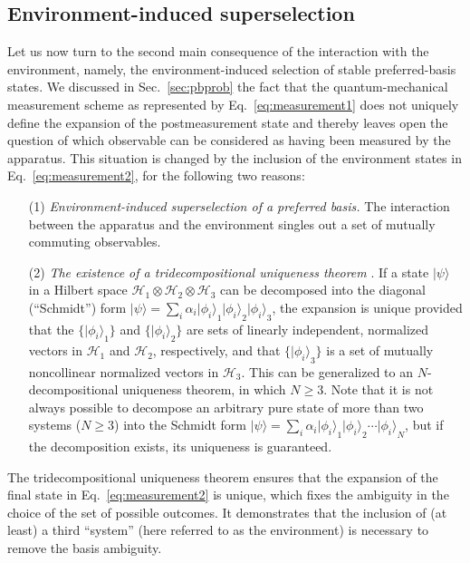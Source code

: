 \documentclass[twocolumn,rmp,aps,amsmath,amsfonts,noshowkeys,noshowpacs]{revtex4}
\newcommand{\ket}[1]{\ensuremath{|{#1\rangle}}}
\begin{document}
\subsection{Environment-induced superselection \label{sec:einsel}}

Let us now turn to the second main consequence of the interaction with
the environment, namely, the environment-induced selection of stable
preferred-basis states.  We discussed in Sec.~\ref{sec:pbprob} the
fact that the quantum-mechanical measurement scheme as represented by
Eq.~\eqref{eq:measurement1} does not uniquely define the expansion of
the postmeasurement state and thereby leaves open the question of
which observable can be considered as having been measured by the
apparatus.  This situation is changed by the inclusion of the
environment states in Eq.~\eqref{eq:measurement2}, for the following
two reasons:

\begin{enumerate} 

\item[(1)] {\em Environment-induced superselection of a preferred basis.}
  The interaction between the apparatus and the environment singles
  out a set of mutually commuting observables.
  
\item[(2)] {\em The existence of a tridecompositional uniqueness
    theorem} \citep{Elby:1994:tz,Clifton:1995:po,Bub:1997:iq}. If a
  state $\ket{\psi}$ in a Hilbert space $\mathcal{H}_1 \otimes
  \mathcal{H}_2 \otimes \mathcal{H}_3$ can be decomposed into the
  diagonal (``Schmidt'') form $\ket{\psi} = \sum_i \alpha_i
  \ket{\phi_i}_1 \ket{\phi_i}_2 \ket{\phi_i}_3$, the expansion is
  unique provided that the $\{ \ket{\phi_i}_1 \}$ and $\{
  \ket{\phi_i}_2 \}$ are sets of linearly independent, normalized
  vectors in $\mathcal{H}_1$ and $\mathcal{H}_2$, respectively, and
  that $\{ \ket{\phi_i}_3 \}$ is a set of mutually noncollinear
  normalized vectors in $\mathcal{H}_3$.  This can be generalized to
  an $N$-decompositional uniqueness theorem, in which $N \ge 3$.  Note
  that it is not always possible to decompose an arbitrary pure state
  of more than two systems ($N \ge 3$) into the Schmidt form
  $\ket{\psi} = \sum_i \alpha_i \ket{\phi_i}_1 \ket{\phi_i}_2 \cdots
  \ket{\phi_i}_N$, but if the decomposition exists, its uniqueness is
  guaranteed.

\end{enumerate}

The tridecompositional uniqueness theorem ensures that the expansion
of the final state in Eq.~\eqref{eq:measurement2} is unique, which
fixes the ambiguity in the choice of the set of possible outcomes. It
demonstrates that the inclusion of (at least) a third ``system'' (here
referred to as the environment) is necessary to remove the basis
ambiguity.
\end{document}
